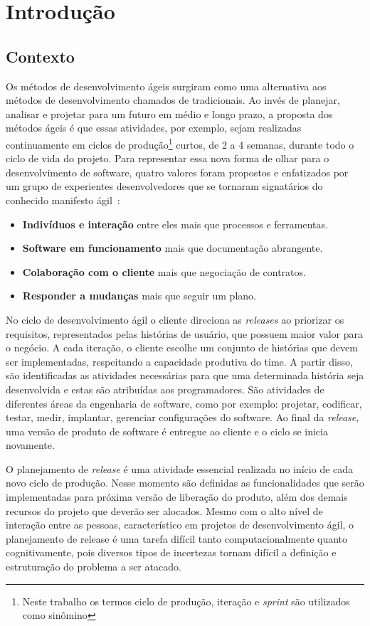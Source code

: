 \chapter{Introdução}
\label{int}
\section{Contexto}
\label{int:con}

Os métodos de desenvolvimento ágeis surgiram como uma alternativa aos métodos de desenvolvimento chamados de tradicionais. Ao invés de planejar, analisar e projetar para um futuro em médio e longo prazo, a proposta dos métodos ágeis é que essas atividades, por exemplo, sejam realizadas continuamente em ciclos de produção\footnote{Neste trabalho os termos ciclo de produção, iteração e \textit{sprint} são utilizados como sinômino} curtos, de 2 a 4 semanas, durante todo o ciclo de vida do projeto.
Para representar essa nova forma de olhar para o desenvolvimento de software, quatro valores foram propostos e enfatizados por um grupo de experientes desenvolvedores que se tornaram signatários do conhecido manifesto ágil~\cite{beckManifesto}:
\begin{itemize}
    \item \textbf{Indivíduos e interação} entre eles mais que processos e ferramentas.
    \item \textbf{Software em funcionamento} mais que documentação abrangente.
    \item \textbf{Colaboração com o cliente} mais que negociação de contratos.
    \item \textbf{Responder a mudanças} mais que seguir um plano.
\end{itemize}

No ciclo de desenvolvimento ágil o cliente direciona as \textit{releases} ao priorizar os requisitos, representados pelas histórias de usuário, que possuem maior valor para o negócio. A cada iteração, o cliente escolhe um conjunto de  histórias que devem ser implementadas, respeitando a capacidade produtiva do time. A partir disso, são identificadas as atividades necessárias para que uma determinada história seja desenvolvida e estas são atribuídas aos programadores. São atividades de diferentes áreas da engenharia de software, como por exemplo: projetar, codificar, testar, medir, implantar, gerenciar configurações do software. Ao final da \textit{release}, uma versão de produto de software é entregue ao cliente e o ciclo se inicia novamente.

O planejamento de \textit{release} é uma atividade essencial realizada no início de cada novo ciclo de produção. Nesse momento são definidas as funcionalidades que serão implementadas para próxima versão de liberação do produto, além dos demais recursos do projeto que deverão ser alocados. Mesmo com o alto nível de interação entre as pessoas, característico em projetos de desenvolvimento ágil, o planejamento de release é uma tarefa difícil tanto computacionalmente quanto cognitivamente, pois diversos tipos de incertezas tornam difícil a definição e estruturação do problema a ser atacado\cite{Ngo}.

